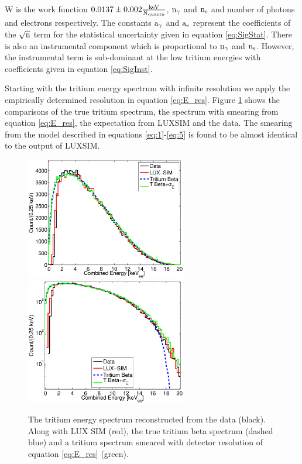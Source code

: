 \noindent W is the work function $0.0137\pm0.002 \rm \frac{keV}{N_{quanta}}$, $\rm n_\gamma$ and $\rm n_e$ and number of photons and electrons respectively. The constants $\rm a_\gamma$ and $\rm a_e$ represent the coefficients of the $\rm \sqrt{n}$ term for the statistical uncertainty given in equation \ref{eq:SigStat}. There is also an instrumental component which is proportional to $\rm n_\gamma$ and $\rm n_e$. However, the instrumental term is sub-dominant at the low tritium energies with coefficients given in equation \ref{eq:SigInst}.

Starting with the tritium energy spectrum with infinite resolution we apply the empirically determined resolution in equation \ref{eq:E_res}. Figure \ref{fig:E_spec} shows the comparisons of the true tritium spectrum, the spectrum with smearing from equation \ref{eq:E_res}, the expectation from LUXSIM and the data. The smearing from the model described in equations \ref{eq:1}-\ref{eq:5} is found to be almost identical to the output of LUXSIM.

\newpage

 \begin{figure}[h!]\centering
\includegraphics[width=70mm]{Chapter_Flucs/Figures/E_Spec/E_spec_compare_SIM.eps}
\includegraphics[width=70mm]{Chapter_Flucs/Figures/E_Spec/E_spec_compare_SIM_log_.eps}
\caption{The tritium energy spectrum reconstructed from the data (black). Along with LUX SIM (red), the true tritium beta spectrum (dashed blue) and a tritium spectrum smeared with detector resolution of equation \ref{eq:E_res} (green). }
\label{fig:E_spec}
\end{figure}

